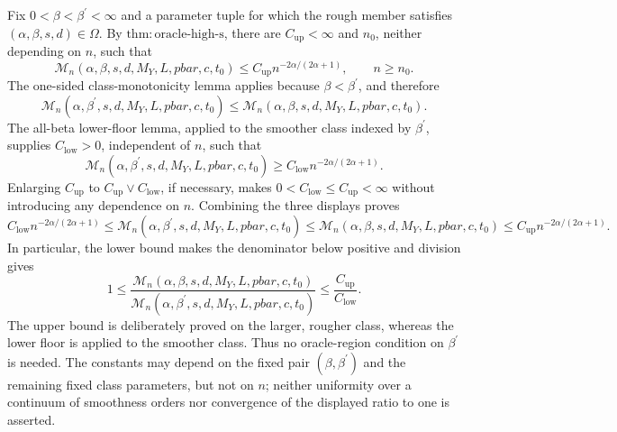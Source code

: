 Fix \(0<\beta<\beta^{\prime}<\infty\) and a parameter tuple for which the rough member satisfies \((\alpha,\beta,s,d)\in\Omega\). By \(\mathrm{thm:oracle\text{-}high\text{-}s}\), there are \(C_{\mathrm{up}}<\infty\) and \(n_0\), neither depending on \(n\), such that
\[
\mathcal M_n(\alpha,\beta,s,d,M_Y,L,pbar,c,t_0)
\le C_{\mathrm{up}}n^{-2\alpha/(2\alpha+1)},\qquad n\ge n_0.
\]
The one-sided class-monotonicity lemma applies because \(\beta<\beta^{\prime}\), and therefore
\[
\mathcal M_n(\alpha,\beta^{\prime},s,d,M_Y,L,pbar,c,t_0)
\le
\mathcal M_n(\alpha,\beta,s,d,M_Y,L,pbar,c,t_0).
\]
The all-beta lower-floor lemma, applied to the smoother class indexed by \(\beta^{\prime}\), supplies \(C_{\mathrm{low}}>0\), independent of \(n\), such that
\[
\mathcal M_n(\alpha,\beta^{\prime},s,d,M_Y,L,pbar,c,t_0)
\ge C_{\mathrm{low}}n^{-2\alpha/(2\alpha+1)}.
\]
Enlarging \(C_{\mathrm{up}}\) to \(C_{\mathrm{up}}\vee C_{\mathrm{low}}\), if necessary, makes \(0<C_{\mathrm{low}}\le C_{\mathrm{up}}<\infty\) without introducing any dependence on \(n\). Combining the three displays proves
\[
C_{\mathrm{low}}n^{-2\alpha/(2\alpha+1)}
\le
\mathcal M_n(\alpha,\beta^{\prime},s,d,M_Y,L,pbar,c,t_0)
\le
\mathcal M_n(\alpha,\beta,s,d,M_Y,L,pbar,c,t_0)
\le
C_{\mathrm{up}}n^{-2\alpha/(2\alpha+1)}.
\]
In particular, the lower bound makes the denominator below positive and division gives
\[
1\le
\frac{\mathcal M_n(\alpha,\beta,s,d,M_Y,L,pbar,c,t_0)}
{\mathcal M_n(\alpha,\beta^{\prime},s,d,M_Y,L,pbar,c,t_0)}
\le \frac{C_{\mathrm{up}}}{C_{\mathrm{low}}}.
\]
The upper bound is deliberately proved on the larger, rougher class, whereas the lower floor is applied to the smoother class. Thus no oracle-region condition on \(\beta^{\prime}\) is needed. The constants may depend on the fixed pair \((\beta,\beta^{\prime})\) and the remaining fixed class parameters, but not on \(n\); neither uniformity over a continuum of smoothness orders nor convergence of the displayed ratio to one is asserted.